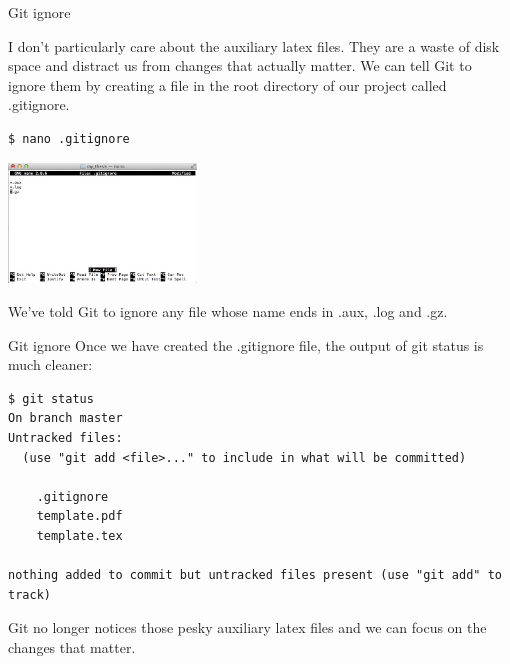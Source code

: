 \documentclass[10pt]{beamer}
\begin{document}
\begin{frame}[fragile]{Git ignore}

I don't particularly care about the auxiliary latex files. They are a waste of disk space and distract us from changes that actually matter. We can tell Git to ignore them by creating a file in the root directory of our project called .gitignore.
\begin{lstlisting}
$ nano .gitignore
\end{lstlisting}
\begin{center}
\includegraphics[width=5cm]{./auxfiles/gitignore.jpg}
\end{center}
We've told Git to ignore any file whose name ends in .aux, .log and .gz. 
\end{frame}

\begin{frame}[fragile]{Git ignore}
Once we have created the .gitignore file, the output of git status is much cleaner:
\begin{lstlisting}
$ git status
On branch master
Untracked files:
  (use "git add <file>..." to include in what will be committed)

	.gitignore
	template.pdf
	template.tex

nothing added to commit but untracked files present (use "git add" to track)
\end{lstlisting}
Git no longer notices those pesky auxiliary latex files and we can focus on the changes that matter.

\end{frame}
\end{document}
